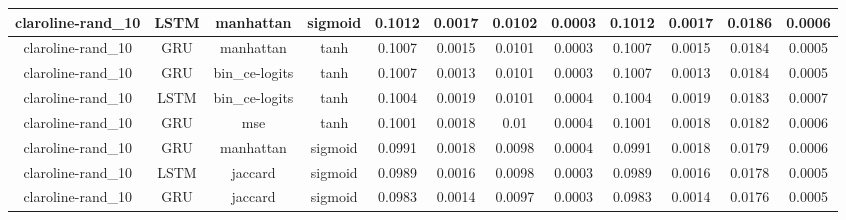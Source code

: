 \documentclass{article}%
\begin{document}
\begin{tabular}{|c|c|c|c|c|c|c|c|c|c|c|c|}
\hline%
claroline{-}rand\_10&LSTM&manhattan&sigmoid&0.1012&0.0017&0.0102&0.0003&0.1012&0.0017&0.0186&0.0006\\%
\hline%
claroline{-}rand\_10&GRU&manhattan&tanh&0.1007&0.0015&0.0101&0.0003&0.1007&0.0015&0.0184&0.0005\\%
\hline%
claroline{-}rand\_10&GRU&bin\_ce{-}logits&tanh&0.1007&0.0013&0.0101&0.0003&0.1007&0.0013&0.0184&0.0005\\%
\hline%
claroline{-}rand\_10&LSTM&bin\_ce{-}logits&tanh&0.1004&0.0019&0.0101&0.0004&0.1004&0.0019&0.0183&0.0007\\%
\hline%
claroline{-}rand\_10&GRU&mse&tanh&0.1001&0.0018&0.01&0.0004&0.1001&0.0018&0.0182&0.0006\\%
\hline%
claroline{-}rand\_10&GRU&manhattan&sigmoid&0.0991&0.0018&0.0098&0.0004&0.0991&0.0018&0.0179&0.0006\\%
\hline%
claroline{-}rand\_10&LSTM&jaccard&sigmoid&0.0989&0.0016&0.0098&0.0003&0.0989&0.0016&0.0178&0.0005\\%
\hline%
claroline{-}rand\_10&GRU&jaccard&sigmoid&0.0983&0.0014&0.0097&0.0003&0.0983&0.0014&0.0176&0.0005\\%
\hline%
\end{tabular}

%
\newpage%
\end{document}
